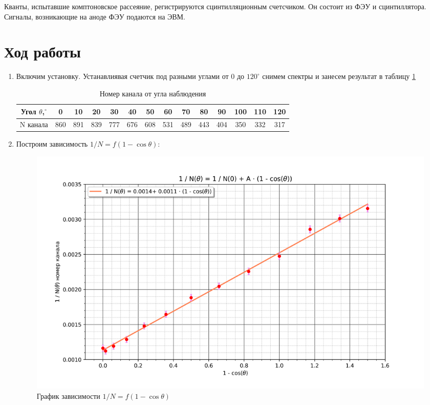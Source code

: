 \documentclass[a4paper]{article}
\begin{document}
Кванты, испытавшие комптоновское рассеяние, регистрируются сцинтилляционным счетсчиком.
Он состоит из ФЭУ и сцинтиллятора. Сигналы, возникающие на аноде ФЭУ подаются на ЭВМ.

\section{Ход работы}

\begin{enumerate}
    \item Включим установку. Устанавлиявая счетчик под разными углами от 0 до $120^{\circ}$
    снимем спектры и занесем результат в таблицу \ref{table}

    \begin{table}[H]
        \centering
        \begin{center}
        \caption{Номер канала от угла наблюдения}
        \end{center}
        \vspace{0.1cm}
        \label{table}
        \begin{tabular}{ |c|c|c|c|c|c|c|c|c|c|c|c|c|c|}
    \hline
       Угол $\theta$,$^{\circ}$ & 0 & 10 & 20&30&40&50&60&70&80&90&100&110&120 \\
     \hline 
        N канала&860&891&839&777&676&608&531&489&443&404&350&332&317\\
    \hline
    \end{tabular}
    \end{table}

    \item Построим зависимость $1/N = f(1 - \cos{\theta})$:

    \begin{figure}[H]
        \begin{center}
        \includegraphics[scale = 0.6]{plot.png}
        \caption{График зависимости $1/N = f(1 - \cos{\theta})$}
        \label{plot}
        \end{center}
    \end{figure}


\end{enumerate}
\end{document}
